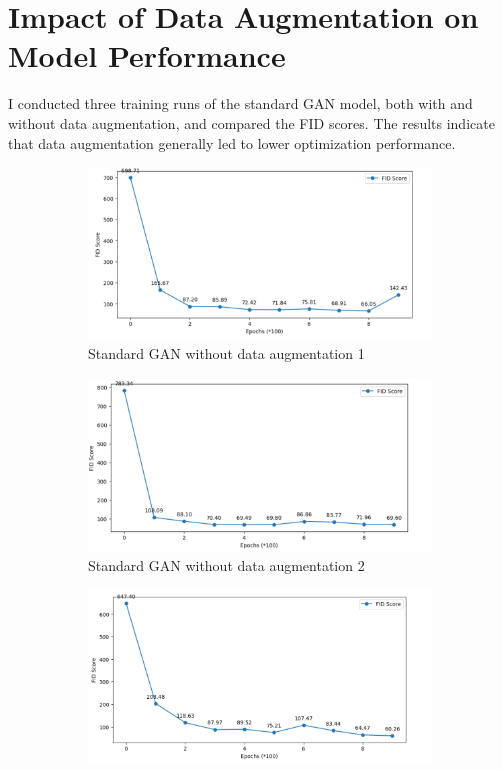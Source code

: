 \section{Impact of Data Augmentation on Model Performance}

I conducted three training runs of the standard GAN model, both with and without data augmentation, 
and compared the FID scores. The results indicate that data augmentation generally led to lower optimization performance.


\begin{figure}[H]
    \centering
    \begin{subfigure}[b]{\linewidth}
        \centering
        \includegraphics[width=0.8\linewidth]{./Images/standard_GAN_without_data_augementation1.jpg}
        \caption{Standard GAN without data augmentation 1}
        \label{fig:Dense}
    \end{subfigure}
    \vspace{0.05\linewidth} 
    \begin{subfigure}[b]{\linewidth}
        \centering
        \includegraphics[width=0.8\linewidth]{./Images/standard_GAN_without_data_augementation2.jpg}
        \caption{Standard GAN without data augmentation 2}
        \label{fig:Conv2DTranspose}
    \end{subfigure}
    \begin{subfigure}[b]{\linewidth}
        \centering
        \includegraphics[width=0.8\linewidth]{./Images/standard_GAN_without_data_augementation3.jpg}

\end{subfigure}
\end{figure}
